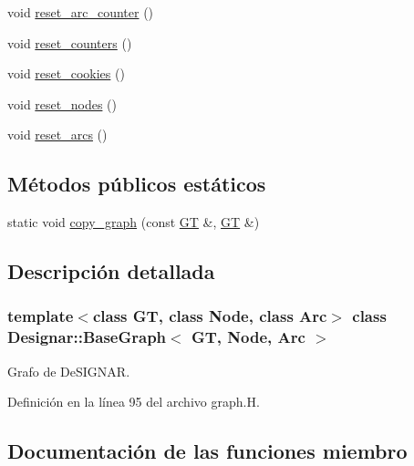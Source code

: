 \begin{DoxyCompactItemize}
\item 
void \hyperlink{class_designar_1_1_base_graph_a8b22e29aa37006fab9c219de86660bdd}{reset\+\_\+arc\+\_\+counter} ()
\item 
void \hyperlink{class_designar_1_1_base_graph_a881c342d8f25d43f995ccfdf876622e1}{reset\+\_\+counters} ()
\item 
void \hyperlink{class_designar_1_1_base_graph_a96a630fd589c34e7e6242f4349606e1c}{reset\+\_\+cookies} ()
\item 
void \hyperlink{class_designar_1_1_base_graph_a1b21c48fed41f36ad4158d718f837c89}{reset\+\_\+nodes} ()
\item 
void \hyperlink{class_designar_1_1_base_graph_a6dc66191c2d752bf7f67a4522a7830e3}{reset\+\_\+arcs} ()
\end{DoxyCompactItemize}
\subsection*{Métodos públicos estáticos}
\begin{DoxyCompactItemize}
\item 
static void \hyperlink{class_designar_1_1_base_graph_ac34a3b513973c2ed43067934f71ace28}{copy\+\_\+graph} (const \hyperlink{demo-buildgraph_8_c_a3001c40d2c31ca87ed96cd7d1334a55e}{GT} \&, \hyperlink{demo-buildgraph_8_c_a3001c40d2c31ca87ed96cd7d1334a55e}{GT} \&)
\end{DoxyCompactItemize}


\subsection{Descripción detallada}
\subsubsection*{template$<$class GT, class Node, class Arc$>$\newline
class Designar\+::\+Base\+Graph$<$ G\+T, Node, Arc $>$}

Grafo de De\+S\+I\+G\+N\+AR. 

Definición en la línea 95 del archivo graph.\+H.



\subsection{Documentación de las funciones miembro}
\mbox{\label{class_designar_1_1_base_graph_a2c91912381c8220c0b2530e5ad187231}} 
